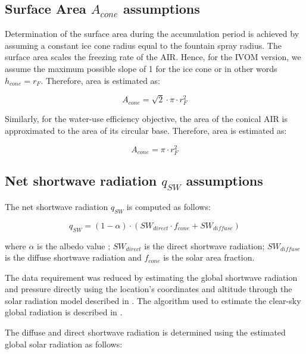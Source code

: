 \subsection{Surface Area $A_{cone}$ assumptions}

Determination of the surface area during the accumulation period is achieved by assuming a constant ice cone
radius equal to the fountain spray radius. The surface area scales the freezing rate of the AIR. Hence, for the
IVOM version, we assume the maximum possible slope of 1 for the ice cone or in other words $h_{cone} = r_{F}$.
Therefore, area is estimated as:  

\begin{equation} A_{cone} =\sqrt{2} \cdot \pi \cdot r_{F}^2  \end{equation}

Similarly, for the water-use efficiency objective, the area of the conical AIR is approximated to the area of
its circular base. Therefore, area is estimated as:

\begin{equation} A_{cone} =\pi \cdot r_{F}^2  \end{equation}

\subsection{Net shortwave radiation \texorpdfstring{$q_{SW}$}{Lg} assumptions}

The net shortwave radiation $q_{SW}$ is computed as follows:

\begin{equation} 
q_{SW} = (1- \alpha) \cdot ( SW_{direct} \cdot f_{cone} + SW_{diffuse})
\end{equation}

where $\alpha$ is the albedo value ; $SW_{direct}$ is the direct shortwave radiation; $SW_{diffuse}$ is the
diffuse shortwave radiation and $f_{cone}$ is the solar area fraction.

The data requirement was reduced by estimating the global shortwave radiation and pressure directly using the
location's coordinates and altitude through the solar radiation model described in
\citet{holmgrenPvlibPythonPython2018}. The algorithm used to estimate the clear-sky global radiation is
described in \citet{ineichenBroadbandSimplifiedVersion2008}.  

The diffuse and direct shortwave radiation is determined using the estimated global solar radiation as follows:


